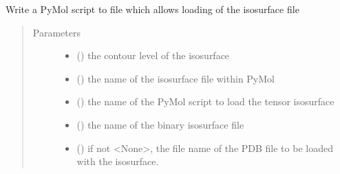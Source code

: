 \documentclass[a4paper,10pt,english]{sphinxmanual}
\begin{document}
\begin{fulllineitems}
\begin{fulllineitems}
\begin{fulllineitems}
\label{\detokenize{reference/generated/paramagpy.metal.Metal.write_pymol_script:paramagpy.metal.Metal.write_pymol_script}}
Write a PyMol script to file which allows loading of the
isosurface file
\begin{quote}\begin{description}
\item[{Parameters}] \leavevmode\begin{itemize}
\item {} 
 (\sphinxstyleliteralemphasis{\sphinxupquote{ (}}\sphinxstyleliteralemphasis{\sphinxupquote{)}}) \textendash{} the contour level of the isosurface

\item {} 
 (\sphinxstyleliteralemphasis{\sphinxupquote{ (}}\sphinxstyleliteralemphasis{\sphinxupquote{)}}) \textendash{} the name of the isosurface file within PyMol

\item {} 
 (\sphinxstyleliteralemphasis{\sphinxupquote{ (}}\sphinxstyleliteralemphasis{\sphinxupquote{)}}) \textendash{} the name of the PyMol script to load the tensor isosurface

\item {} 
 (\sphinxstyleliteralemphasis{\sphinxupquote{ (}}\sphinxstyleliteralemphasis{\sphinxupquote{)}}) \textendash{} the name of the binary isosurface file

\item {} 
 (\sphinxstyleliteralemphasis{\sphinxupquote{ (}}\sphinxstyleliteralemphasis{\sphinxupquote{)}}) \textendash{} if not \textless{}None\textgreater{}, the file name of the PDB file to be loaded with
the isosurface.


\end{itemize}
\end{description}
\end{quote}
\end{fulllineitems}
\end{fulllineitems}
\end{fulllineitems}
\end{document}
